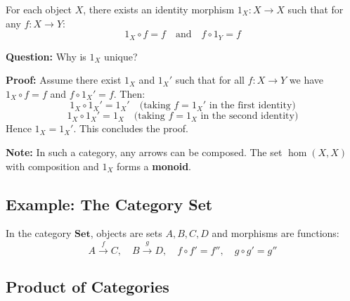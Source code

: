 \documentclass{article}
\begin{document}
For each object $X$, there exists an identity morphism $1_X : X \to X$ such that for any $f : X \to Y$:
\[
1_X \circ f = f \quad \text{and} \quad f \circ 1_Y = f
\]

\begin{center}
\end{center}

\textbf{Question:} Why is $1_X$ unique?

\textbf{Proof:} Assume there exist $1_X$ and $1_X'$ such that for all $f : X \to Y$ we have $1_X \circ f = f$ and $f \circ 1_X' = f$. Then:
\[
1_X \circ 1_X' = 1_X' \quad \text{(taking $f = 1_X'$ in the first identity)}
\]
\[
1_X \circ 1_X' = 1_X \quad \text{(taking $f = 1_X$ in the second identity)}
\]
Hence $1_X = 1_X'$. This concludes the proof.

\textbf{Note:} In such a category, any arrows can be composed. The set $\hom(X, X)$ with composition and $1_X$ forms a \textbf{monoid}.

\subsection{Example: The Category Set}

In the category $\mathbf{Set}$, objects are sets $A, B, C, D$ and morphisms are functions:
\[
A \xrightarrow{f} C, \quad B \xrightarrow{g} D, \quad f \circ f' = f'', \quad g \circ g' = g''
\]

\begin{center}
\qquad
{}
\end{center}

\subsection{Product of Categories}
\end{document}
